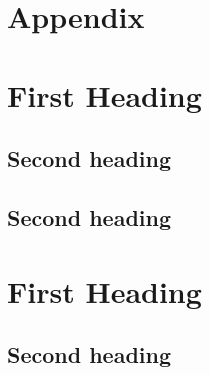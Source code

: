 \chapter*{\centering \huge Appendix} %

\clearpage
\newpage

\appendixwithtoc 
{} %
\clearpage
\newpage
{} %

\chapter{First Heading} \label{apx:first-heading}

\section{Second heading} \label{apx:second-heading}

\section{Second heading}





\newpage



\chapter{First Heading} \label{apx:first-heading}

\section{Second heading} \label{apx:second-heading}

